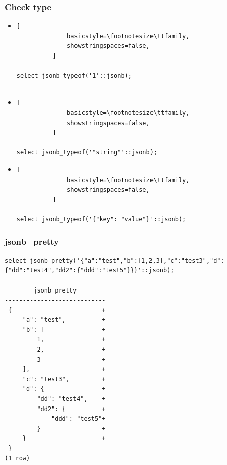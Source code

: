 \documentclass[14pt, compress]{beamer}
\begin{document}
\begin{frame}[fragile]
  \frametitle{Check type}

  \begin{itemize}
      \item
          \begin{lstlisting}[
              basicstyle=\footnotesize\ttfamily,
              showstringspaces=false,
          ]

select jsonb_typeof('1'::jsonb);
         
          \end{lstlisting}

      \item
          \begin{lstlisting}[
              basicstyle=\footnotesize\ttfamily,
              showstringspaces=false,
          ]

select jsonb_typeof('"string"'::jsonb);

          \end{lstlisting}

      \item
          \begin{lstlisting}[
              basicstyle=\footnotesize\ttfamily,
              showstringspaces=false,
          ]

select jsonb_typeof('{"key": "value"}'::jsonb);

          \end{lstlisting}

  \end{itemize}

\end{frame}

\begin{frame}[fragile]
  \frametitle{jsonb\_pretty}

  \begin{lstlisting}[]
select jsonb_pretty('{"a":"test","b":[1,2,3],"c":"test3","d":{"dd":"test4","dd2":{"ddd":"test5"}}}'::jsonb);

        jsonb_pretty        
----------------------------
 {                         +
     "a": "test",          +
     "b": [                +
         1,                +
         2,                +
         3                 +
     ],                    +
     "c": "test3",         +
     "d": {                +
         "dd": "test4",    +
         "dd2": {          +
             "ddd": "test5"+
         }                 +
     }                     +
 }
(1 row)
  \end{lstlisting}

\end{frame}
\end{document}
